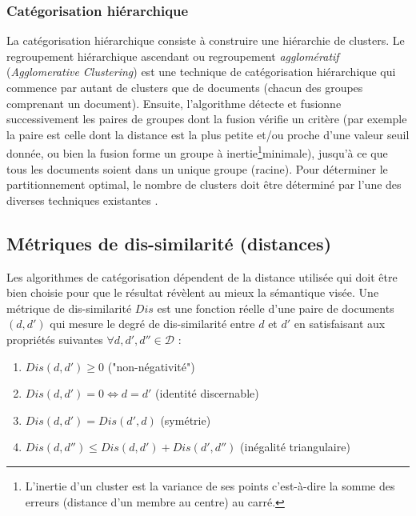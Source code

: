 
\subsubsection{Catégorisation hiérarchique}
La catégorisation hiérarchique consiste à construire une hiérarchie de clusters. Le regroupement hiérarchique ascendant ou regroupement \textit{agglomératif} (\textit{Agglomerative Clustering}) est une technique de catégorisation hiérarchique qui commence par autant de clusters que de documents (chacun des groupes comprenant un document). Ensuite, l'algorithme détecte et fusionne successivement les paires de groupes dont la fusion vérifie un critère (par exemple la paire est celle dont la distance est la plus petite et/ou proche d'une valeur seuil donnée, ou bien la fusion forme un groupe à inertie\footnote{L'inertie d'un cluster est la variance de ses points c'est-à-dire la somme des erreurs (distance d'un membre au centre) au carré.}minimale),
jusqu'à ce que tous les documents soient dans un unique groupe (racine). Pour déterminer le partitionnement optimal, le nombre de clusters doit être déterminé par l'une des diverses techniques existantes \citep{thorndike1953HAC_nb_clusters, salvador2004Hierarchical_clustering_number_of_clusters}.

\subsection{Métriques de dis-similarité (distances)}
\label{sec:similarite:distances}
Les algorithmes de catégorisation dépendent de la distance utilisée qui doit être bien choisie pour que le résultat révèlent au mieux la sémantique visée.
 Une métrique de dis-similarité $Dis$ est une fonction réelle d'une paire de documents $(d,d')$ qui mesure le degré de dis-similarité entre $d$ et $d'$  en satisfaisant aux propriétés suivantes $\forall d,d',d'' \in \mathcal{D}$ \citep{wang2015distancemetriclearningsurvey}:
\begin{enumerate}
\item $Dis(d,d') \geq 0$ ("non-négativité")
\item $Dis(d,d') = 0  \Leftrightarrow d = d'$ (identité discernable)
\item $Dis(d,d') = Dis(d', d)$ (symétrie)
\item $Dis(d,d'') \leq Dis(d,d') + Dis(d',d'')$ (inégalité triangulaire) \label{enum:sim:ineq-tri}
\end{enumerate}


